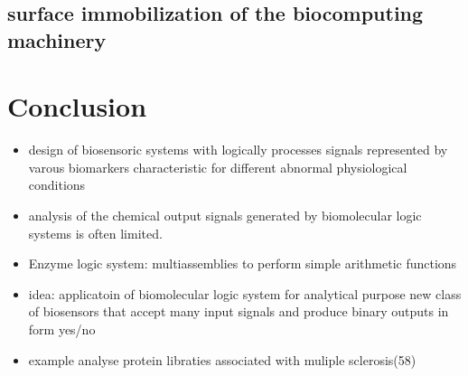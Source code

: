 \documentclass[runningheads]{llncs}
\begin{document}
	\subsection{surface immobilization of the biocomputing machinery}
	
	
	




\section{Conclusion}

\begin{itemize}
	\item design of biosensoric systems with logically processes signals represented by varous biomarkers characteristic for different abnormal physiological conditions
	\item analysis of the chemical output signals generated by biomolecular logic systems is often limited.
	\item Enzyme logic system: multiassemblies to perform simple arithmetic functions
	\item idea: applicatoin of biomolecular logic system for analytical purpose new class of biosensors that accept many input signals and produce binary outputs in form yes/no 
	\item example analyse protein libraties associated with muliple sclerosis(58)
\end{itemize}
\end{document}
